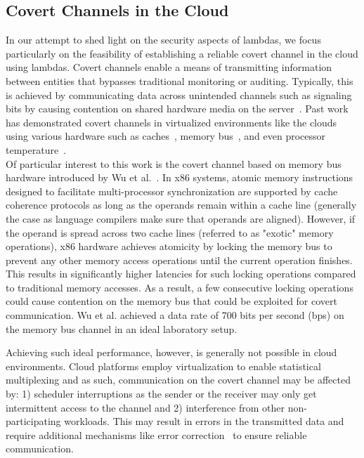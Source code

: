 \subsection{Covert Channels in the Cloud}
\label{sec:background:covertchannels}
In our attempt to shed light on the security aspects of lambdas, we focus
particularly on the feasibility of establishing a reliable covert channel in the
cloud using lambdas.  Covert channels enable a means of transmitting information
between entities that bypasses traditional monitoring or auditing. Typically,
this is achieved by communicating data across unintended channels such as
signaling bits by causing contention on shared hardware media on the
server~\cite{L2cacheCovertChannels,
ProcessorCovertChannels,ThermalCovertChannel,SshOverCovertChannel,wuusenix2012}.
Past work has demonstrated covert channels in virtualized environments like the
clouds using various hardware such as
caches~\cite{ristenpartccs2009,L2cacheCovertChannels}, memory
bus~\cite{wuusenix2012}, and even processor
temperature~\cite{ThermalCovertChannel}. \\

Of particular interest to this work is the covert channel based on memory bus
hardware introduced by Wu et al.~\cite{wuusenix2012}.  In x86 systems, atomic
memory instructions designed to facilitate multi-processor synchronization are
supported by cache coherence protocols as long as the operands remain within a
cache line (generally the case as language compilers make sure that operands are
aligned). However, if the operand is spread across two cache lines (referred to
as "exotic" memory operations), x86 hardware achieves atomicity by locking the
memory bus to prevent any other memory access operations until the current
operation finishes. This results in significantly higher latencies for such
locking operations compared to traditional memory accesses. As a result, a few
consecutive locking operations could cause contention on the memory bus that
could be exploited for covert communication.  Wu et al. achieved a data rate of
700 bits per second (bps) on the memory bus channel in an ideal laboratory
setup.

Achieving such ideal performance, however, is generally not possible in cloud 
environments. Cloud platforms employ virtualization to enable statistical 
multiplexing and as such, communication on the covert channel may be affected by:
1) scheduler interruptions as the sender or the receiver may only get intermittent 
access to the channel and 2) interference from other non-participating
workloads. This may result in errors in the transmitted data and require 
additional mechanisms like error correction~\cite{wuusenix2012} to ensure
reliable communication.


